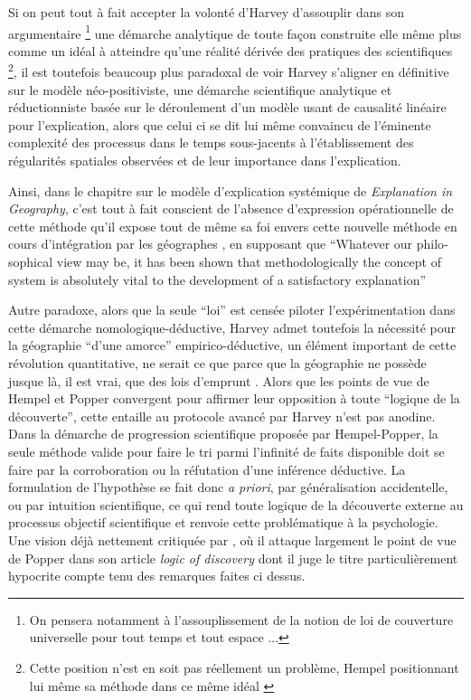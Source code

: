 Si on peut tout à fait accepter la volonté d'Harvey d'assouplir dans son argumentaire \footnote{On pensera notamment à l'assouplissement de la notion de loi de couverture universelle pour tout temps et tout espace ... } une démarche analytique de toute façon construite elle même plus comme un idéal à atteindre qu'une réalité dérivée des pratiques des scientifiques \footnote{Cette position n'est en soit pas réellement un problème, Hempel positionnant lui même sa méthode dans ce même idéal \autocite{Besse2000}}, il est toutefois beaucoup plus paradoxal de voir Harvey s'aligner en définitive sur le modèle néo-positiviste, une démarche scientifique analytique et réductionniste \autocite[57-59]{Paterson1984} basée sur le déroulement d'un modèle usant de causalité linéaire pour l'explication, alors que celui ci se dit lui même convaincu de l'éminente complexité des processus dans le temps sous-jacents à l'établissement des régularités spatiales observées et de leur importance dans l'explication.

Ainsi, dans le chapitre sur le modèle d'explication systémique de \textit{Explanation in Geography}, c'est tout à fait conscient de l'absence d'expression opérationnelle de cette méthode qu'il expose tout de même sa foi envers cette nouvelle méthode en cours d'intégration par les géographes \autocite[449,469]{Harvey1969}, en supposant que \foreignquote{english}{Whatever our philosophical view may be, it has been shown that methodologically the concept of system is absolutely vital to the development of a satisfactory explanation} \autocite[479]{Harvey1969}

Autre paradoxe, alors que la seule \enquote{loi} est censée piloter l’expérimentation dans cette démarche nomologique-déductive, Harvey admet toutefois la nécessité pour la géographie \enquote{d'une amorce} empirico-déductive, un élément important de cette révolution quantitative, ne serait ce que parce que la géographie ne possède jusque là, il est vrai, que des lois d'emprunt \autocite[41-42]{Harvey1969}. Alors que les points de vue de Hempel et Popper convergent pour affirmer leur opposition à toute \enquote{logique de la découverte}, cette entaille au protocole avancé par Harvey n'est pas anodine. Dans la démarche de progression scientifique proposée par Hempel-Popper, la seule méthode valide pour faire le tri parmi l'infinité de faits disponible doit se faire par la corroboration ou la réfutation d'une inférence déductive. La formulation de l'hypothèse se fait donc \textit{a priori}, par généralisation accidentelle, ou par intuition scientifique, ce qui rend toute logique de la découverte externe au processus objectif scientifique et renvoie cette problématique à la psychologie. Une vision déjà nettement critiquée par \textcite{Simon1973}, où il attaque largement le point de vue de Popper dans son article \textit{logic of discovery} dont il juge le titre particulièrement hypocrite compte tenu des remarques faites ci dessus.

